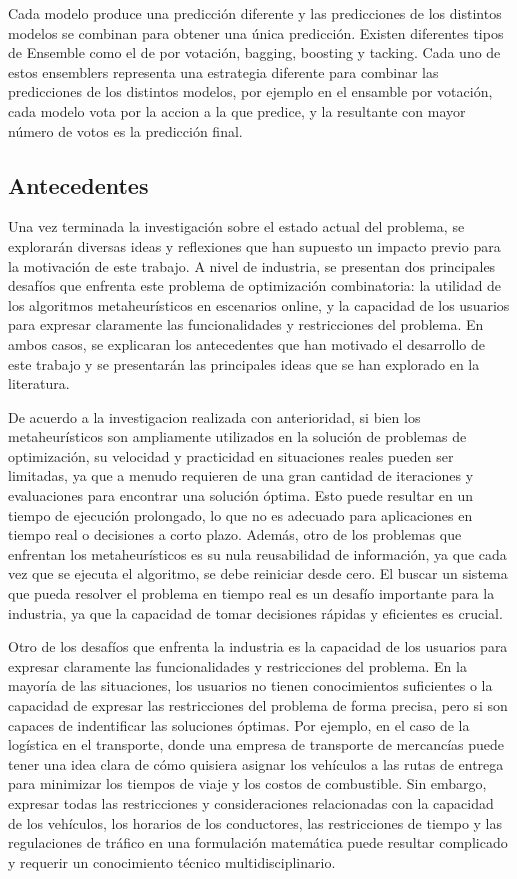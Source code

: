 Cada modelo produce una predicción diferente y las predicciones de los distintos modelos se combinan 
para obtener una única predicción. Existen diferentes tipos de Ensemble como el de por votación, bagging, 
boosting y tacking. Cada uno de estos ensemblers representa una estrategia diferente para combinar las 
predicciones de los distintos modelos, por ejemplo en el ensamble por votación, cada modelo vota por 
la accion a la que predice, y la resultante con mayor número de votos es la predicción final.

\subsection{Antecedentes}
Una vez terminada la investigación sobre el estado actual del problema, se explorarán diversas ideas 
y reflexiones que han supuesto un impacto previo para la motivación de este trabajo. A nivel de industria, se 
presentan dos principales desafíos que enfrenta este problema de optimización combinatoria: la utilidad de los 
algoritmos metaheurísticos en escenarios online, y la capacidad de los usuarios para expresar claramente las 
funcionalidades y restricciones del problema. En ambos casos, se explicaran los antecedentes que han motivado
el desarrollo de este trabajo y se presentarán las principales ideas que se han explorado en la literatura.\medskip

De acuerdo a la investigacion realizada con anterioridad, si bien los metaheurísticos son ampliamente utilizados 
en la solución de problemas de optimización, su velocidad y practicidad en situaciones reales pueden ser limitadas, 
ya que a menudo requieren de una gran cantidad de iteraciones y evaluaciones para encontrar una solución óptima. 
Esto puede resultar en un tiempo de ejecución prolongado, lo que no es adecuado para aplicaciones en tiempo real 
o decisiones a corto plazo. Además, otro de los problemas que enfrentan los metaheurísticos es su nula 
reusabilidad de información, ya que cada vez que se ejecuta el algoritmo, se debe reiniciar desde cero.
El buscar un sistema que pueda resolver el problema en tiempo real es un desafío importante para la 
industria, ya que la capacidad de tomar decisiones rápidas y eficientes es crucial.\medskip 

Otro de los desafíos que enfrenta la industria es la capacidad de los usuarios para expresar claramente las
funcionalidades y restricciones del problema. En la mayoría de las situaciones, los usuarios no tienen conocimientos
suficientes o la capacidad de expresar las restricciones del problema de forma precisa, pero si son capaces de
indentificar las soluciones óptimas. Por ejemplo, en el caso de la logística en el transporte, donde una empresa 
de transporte de mercancías puede tener una idea clara de cómo quisiera asignar los vehículos a las rutas de 
entrega para minimizar los tiempos de viaje y los costos de combustible. Sin embargo, expresar todas las 
restricciones y consideraciones relacionadas con la capacidad de los vehículos, los horarios de los conductores, 
las restricciones de tiempo y las regulaciones de tráfico en una formulación matemática puede resultar complicado 
y requerir un conocimiento técnico multidisciplinario.\medskip

